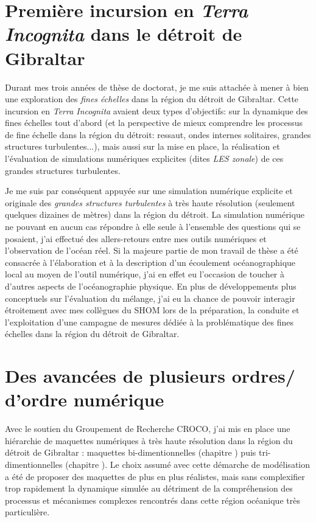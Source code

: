 

\section{Première incursion en \textit{Terra Incognita} dans le détroit de Gibraltar}
Durant mes trois années de thèse de doctorat, je me suis attachée à mener à bien une exploration des \textit{fines échelles} dans la région du détroit de Gibraltar. Cette incursion en \textit{Terra Incognita} avaient deux types d'objectifs: sur la dynamique des fines échelles tout d'abord (et la perspective de mieux comprendre les processus de fine échelle dans la région du détroit: ressaut, ondes internes solitaires, grandes structures turbulentes...), mais aussi sur la mise en place, la réalisation et l'évaluation de simulations numériques explicites (dites \textit{LES zonale}) de ces grandes structures turbulentes.

Je me suis par conséquent appuyée sur une simulation numérique explicite et originale des \textit{grandes structures turbulentes} à très haute résolution (seulement quelques dizaines de mètres) dans la région du détroit. La simulation numérique ne pouvant en aucun cas répondre à elle seule à l'ensemble des questions qui se posaient, j'ai effectué des allers-retours entre mes outils numériques et l'observation de l'océan réel. Si la majeure partie de mon travail de thèse a été consacrée à l'élaboration et à la description d'un écoulement océanographique local au moyen de l'outil numérique, j'ai en effet eu l'occasion de toucher à d'autres aspects de l'océanographie physique.
En plus de développements plus conceptuels sur l'évaluation du mélange,  j'ai eu la chance de pouvoir interagir étroitement avec mes collègues du SHOM lors de la préparation, la conduite et l'exploitation d'une campagne de mesures dédiée à la problématique des fines échelles dans la région du détroit de Gibraltar.

\section{Des avancées de plusieurs ordres/ d'ordre numérique}
Avec le soutien du Groupement de Recherche CROCO, j'ai mis en place une hiérarchie de maquettes numériques à très haute résolution dans la région du détroit de Gibraltar : maquettes bi-dimentionnelles (chapitre ) puis tri-dimentionnelles (chapitre ). Le choix assumé avec cette démarche de modélisation a été de proposer des maquettes de plus en plus réalistes, mais sans complexifier trop rapidement la dynamique simulée au détriment de la compréhension des processus et mécanismes complexes rencontrés dans cette région océanique très particulière. 

